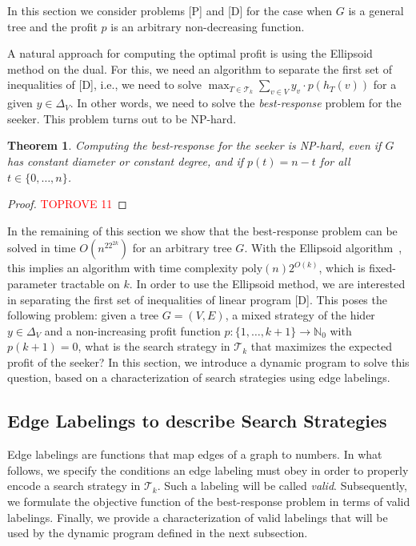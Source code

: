 \documentclass[11pt]{article}
\newtheorem{theorem}{Theorem}[section]
\newcommand{\N}{\mathbb{N}}
\newcommand{\BSTs}{\mathcal{T}}
\newcommand\+{\mkern2mu}
\newcommand{\T}{T}
\begin{document}
In this section we consider problems [P] and [D] for the case when $G$ is a general tree and the profit $p$ is an arbitrary non-decreasing function.

A natural approach for computing the optimal profit is using the Ellipsoid method on the dual. For this, we need an algorithm to separate the first set of inequalities of [D], i.e., we need to solve $\max_{\T \in \mathcal{T}_k} \sum_{v \in V}y_{v} \cdot p(h_T(v))$ for a given $y\in \Delta_V$. In other words, we need to solve the \emph{best-response} problem for the seeker. 
This problem turns out to be NP-hard. 

\begin{theorem}\label{thm:bestResponseHardness}
Computing the best-response for the seeker is NP-hard, even if $G$ has constant diameter or constant degree, and if $p(t)=n-t$ for all $t\in \{0,\ldots,n\}$.
\end{theorem}
\begin{proof}\textcolor{red}{TOPROVE 11}\end{proof}

In the remaining of this section we show that the best-response problem can be solved in time $O(n^22^{2k})$ for an arbitrary tree $G$. With the Ellipsoid algorithm~\cite{grotschel_ellipsoid_1981}, this implies an algorithm with time complexity $\text{poly}(n)2^{O(k)}$, which is fixed-parameter tractable on $k$.
In order to use the Ellipsoid method, we are interested in separating the first set of inequalities of linear program [D]. This poses the following problem: given a tree $G=(V, E)$, a mixed strategy of the hider $y \in \Delta_V$ and a non-increasing profit function $p: \{1, \ldots, k+1\} \to \N_0$ with $p(k+1)=0$, what is the search strategy in $\BSTs_k$ that maximizes the expected profit of the seeker? In this section, we introduce a dynamic program to solve this question, based on a characterization of search strategies using edge labelings.

\subsection{Edge Labelings to describe Search Strategies} \label{sec:edge-labelings}

Edge labelings are functions that map edges of a graph to numbers. In what follows, we specify the conditions an edge labeling must obey in order to properly encode a search strategy in $\BSTs_k$. Such a labeling will be called \emph{valid}. Subsequently, we formulate the objective function of the best-response problem in terms of valid labelings. Finally, we provide a characterization of valid labelings that will be used by the dynamic program defined in the next subsection.
\end{document}
